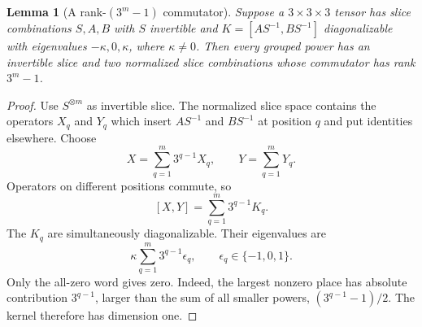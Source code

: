 \documentclass[11pt]{article}
\newtheorem{lemma}[theorem]{Lemma}
\theoremstyle{remark}\newtheorem{remark}[theorem]{Remark}
\begin{document}
\begin{lemma}[A rank-$(3^m-1)$ commutator]\label{lem:ternary}
Suppose a $3\times3\times3$ tensor has slice combinations $S,A,B$ with $S$ invertible and $K=[AS^{-1},BS^{-1}]$ diagonalizable with eigenvalues $-\kappa,0,\kappa$, where $\kappa\ne0$. Then every grouped power has an invertible slice and two normalized slice combinations whose commutator has rank $3^m-1$.
\end{lemma}
\begin{proof}
Use $S^{\otimes m}$ as invertible slice. The normalized slice space contains the operators $X_q$ and $Y_q$ which insert $AS^{-1}$ and $BS^{-1}$ at position $q$ and put identities elsewhere. Choose
\[
 X=\sum_{q=1}^m3^{q-1}X_q,\qquad Y=\sum_{q=1}^mY_q.
\]
Operators on different positions commute, so
\[
 [X,Y]=\sum_{q=1}^m3^{q-1}K_q.
\]
The $K_q$ are simultaneously diagonalizable. Their eigenvalues are
\[
 \kappa\sum_{q=1}^m3^{q-1}\epsilon_q,\qquad \epsilon_q\in\{-1,0,1\}.
\]
Only the all-zero word gives zero. Indeed, the largest nonzero place has absolute contribution $3^{q-1}$, larger than the sum of all smaller powers, $(3^{q-1}-1)/2$. The kernel therefore has dimension one.
\end{proof}
\end{document}
